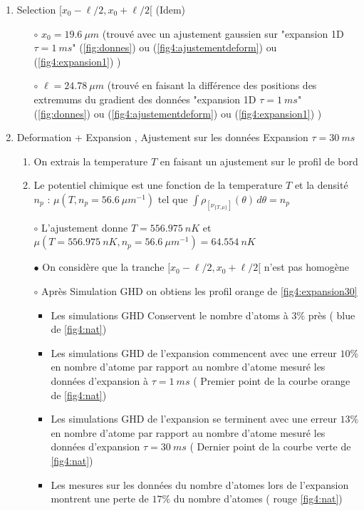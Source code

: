 \documentclass[a3, 10pt,twoside]{article}          %
\theoremstyle{plain}
\theoremstyle{definition}
\theoremstyle{remark}
\theoremstyle{definition} %
\def\OliveGreen{OliveGreen}
\begin{document}
			\begin{enumerate}[label =\Alph*)]
			
				
				\item Selection $[ x_0 - \ell/2 , x_0 + \ell/2[$ (Idem)
					\begin{itemize}
								\item[$\circ$] $x_0 = 19.6 ~\mu m $ (trouvé avec un ajustement gaussien sur {\color{OliveGreen}"expansion 1D $\tau =1~ms$" (\ref{fig:donnes})} ou {\color{orange} (\ref{fig4:ajustementdeform}) } ou {\color{blue}(\ref{fig4:expansion1})} ) 
								\item[$\circ$] $\ell = 24.78 ~ \mu m $ (trouvé en faisant la différence des positions des extremums du gradient des données {\color{OliveGreen}"expansion 1D $\tau =1~ms$" (\ref{fig:donnes})} ou {\color{orange} (\ref{fig4:ajustementdeform}) } ou {\color{blue}(\ref{fig4:expansion1})} )
							\end{itemize}
				

				\item Deformation + Expansion , Ajustement sur les données Expansion $\tau = 30 ~ms$ 
					\begin{enumerate}[label =\alph*)]

	
						\item On extrais la temperature $T$ en faisant un ajustement sur le profil de bord 
						\item Le potentiel chimique est une fonction de la temperature $T$ et la densité $n_p$ : $\mu( T , n_p = 56.6 ~{\mu m}^{-1} )$ tel que $\int \rho_{ [ \nu_{\{T,\mu\}} ] } (\theta) \, d \theta  = n_p $ 
						\item[$\circ$] L'ajustement donne $T = 556.975 ~nK$ et $\mu( T=556.975 ~nK , n_p = 56.6 ~{\mu m}^{-1} ) = 64.554~nK $ 

								\item[$\bullet$]	 On considère que la tranche $[ x_0 - \ell/2 , x_0 + \ell/2[$ n'est pas homogène 
								\item[$\circ$] Après Simulation GHD on obtiens les profil {\color{orange} orange de \ref{fig4:expansion30}}  
									\begin{itemize}
										\item Les simulations GHD Conservent le nombre d'atoms à $3\%$ près ({\color{blue} blue de \ref{fig4:nat}})
										\item Les simulations GHD de l'expansion commencent avec une erreur $10\%$ en nombre d'atome par rapport au nombre d'atome mesuré les données d'expansion à $\tau = 1~ms$ ({\color{orange} Premier point de la courbe orange de \ref{fig4:nat}}) 
										\item Les simulations GHD de l'expansion se terminent avec une erreur $13\%$ en nombre d'atome par rapport au nombre d'atome mesuré les données d'expansion $\tau = 30~ms$ ({\color{\OliveGreen} Dernier point de la courbe verte de \ref{fig4:nat}})
										\item Les mesures sur les données du nombre d'atomes lors de l'expansion montrent une perte de $17\%$ du nombre d'atomes ({\color{red} rouge \ref{fig4:nat}})
									\end{itemize}	 	



\end{enumerate}
\end{enumerate}
\end{document}
